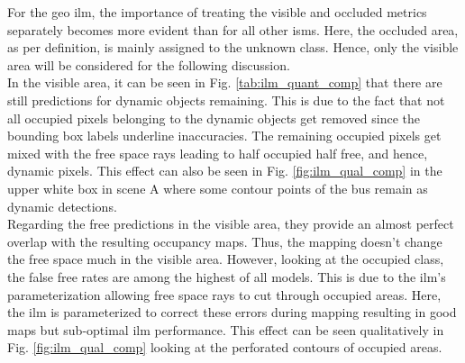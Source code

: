 For the geo \gls{ilm}, the importance of treating the visible and occluded metrics separately becomes more evident than for all other \gls{ism}s. Here, the occluded area, as per definition, is mainly assigned to the unknown class. Hence, only the visible area will be considered for the following discussion.\\
In the visible area, it can be seen in Fig. \ref{tab:ilm_quant_comp} that there are still predictions for dynamic objects remaining. This is due to the fact that not all occupied pixels belonging to the dynamic objects get removed since the bounding box labels underline inaccuracies. The remaining occupied pixels get mixed with the free space rays leading to half occupied half free, and hence, dynamic pixels. This effect can also be seen in Fig. \ref{fig:ilm_qual_comp} in the upper white box in scene A where some contour points of the bus remain as dynamic detections.\\
Regarding the free predictions in the visible area, they provide an almost perfect overlap with the resulting occupancy maps. Thus, the mapping doesn't change the free space much in the visible area. However, looking at the occupied class, the false free rates are among the highest of all models. This is due to the \gls{ilm}'s parameterization allowing free space rays to cut through occupied areas. Here, the \gls{ilm} is parameterized to correct these errors during mapping resulting in good maps but sub-optimal \gls{ilm} performance. This effect can be seen qualitatively in Fig. \ref{fig:ilm_qual_comp} looking at the perforated contours of occupied areas.

